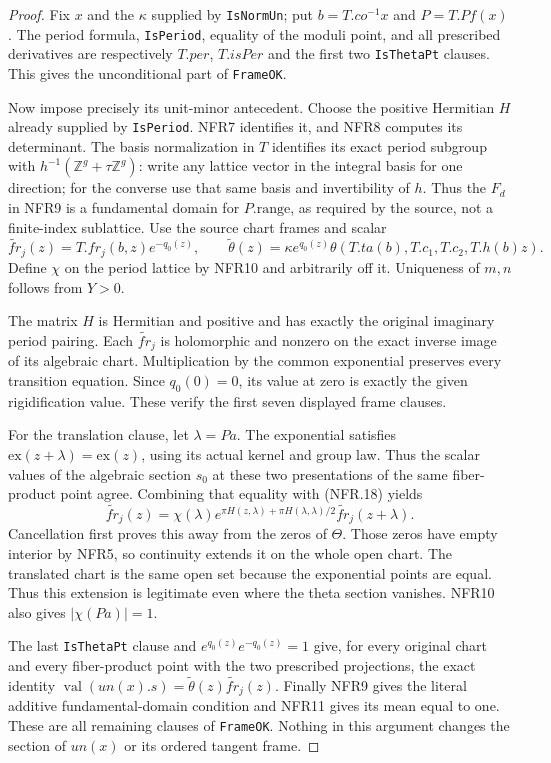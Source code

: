 \begin{proof}
Fix $x$ and the $\kappa$ supplied by \texttt{IsNormUn}; put
$b=T.co^{-1}x$ and $P=T.Pf(x)$.
The period formula, \texttt{IsPeriod}, equality of the moduli
point, and all prescribed derivatives are respectively $T.per$,
$T.isPer$ and the first two \texttt{IsThetaPt} clauses.
This gives the unconditional part of \texttt{FrameOK}.

Now impose precisely its unit-minor antecedent.
Choose the positive Hermitian $H$ already supplied by
\texttt{IsPeriod}.  NFR7 identifies it, and NFR8 computes its
determinant.  The basis normalization in $T$ identifies its exact
period subgroup with $h^{-1}(\mathbb Z^g+\tau\mathbb Z^g)$:
write any lattice vector in the integral basis for one direction;
for the converse use that same basis and invertibility of $h$.
Thus the $F_d$ in NFR9 is a fundamental domain for $P.\mathrm{range}$,
as required by the source, not a finite-index sublattice.
Use the source chart frames and scalar
\[
 \widetilde{fr}_j(z)=T.fr_j(b,z)e^{-q_0(z)},\qquad
 \widetilde\theta(z)=\kappa e^{q_0(z)}\theta(T.ta(b),T.c_1,T.c_2,T.h(b)z).
 \tag{NFR.22}
\]
Define $\chi$ on the period lattice by NFR10 and arbitrarily
off it.  Uniqueness of $m,n$ follows from $Y>0$.

The matrix $H$ is Hermitian and positive and has exactly the
original imaginary period pairing.  Each $\widetilde{fr}_j$ is
holomorphic and nonzero on the exact inverse image of its
algebraic chart.  Multiplication by the common exponential
preserves every transition equation.  Since $q_0(0)=0$, its
value at zero is exactly the given rigidification value.
These verify the first seven displayed frame clauses.

For the translation clause, let $\lambda=Pa$.
The exponential satisfies $\mathrm{ex}(z+\lambda)=\mathrm{ex}(z)$,
using its actual kernel and group law.  Thus the scalar values
of the algebraic section $s_0$ at these two presentations of
the same fiber-product point agree.  Combining that equality
with (NFR.18) yields
\[
 \widetilde{fr}_j(z)=\chi(\lambda)
    e^{\pi H(z,\lambda)+\pi H(\lambda,\lambda)/2}
                           \widetilde{fr}_j(z+\lambda).
 \tag{NFR.23}
\]
Cancellation first proves this away from the zeros of $\Theta$.
Those zeros have empty interior by NFR5, so continuity extends
it on the whole open chart.  The translated chart is the same
open set because the exponential points are equal.  Thus this
extension is legitimate even where the theta section vanishes.
NFR10 also gives $|\chi(Pa)|=1$.

The last \texttt{IsThetaPt} clause and
$e^{q_0(z)}e^{-q_0(z)}=1$ give, for every original chart and
every fiber-product point with the two prescribed projections,
the exact identity
$\operatorname{val}(un(x).s)=\widetilde\theta(z)
\widetilde{fr}_j(z)$.  Finally NFR9 gives the literal additive
fundamental-domain condition and NFR11 gives its mean equal to
one.  These are all remaining clauses of \texttt{FrameOK}.
Nothing in this argument changes the section of $un(x)$ or its
ordered tangent frame.
\end{proof}

